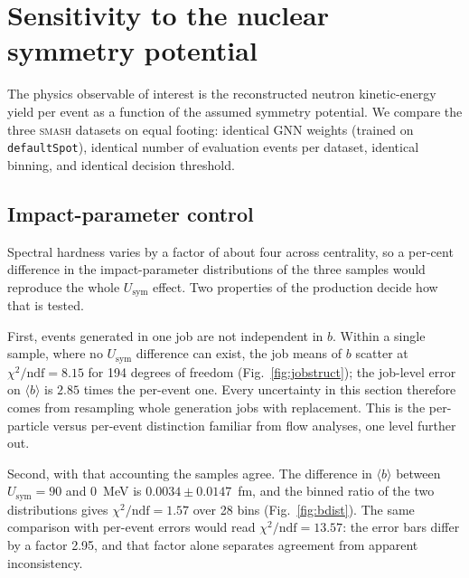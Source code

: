 \documentclass[aps,prc,twocolumn,superscriptaddress,showpacs,%
               nofootinbib,floatfix,longbibliography]{revtex4-2}
\newcommand{\Usym}{U_{\text{sym}}}
\newcommand{\SMASH}{\textsc{smash}}
\begin{document}
\section{Sensitivity to the nuclear symmetry potential}
\label{sec:sensitivity}

The physics observable of interest is the reconstructed neutron
kinetic-energy yield per event as a function of the assumed symmetry
potential.  We compare the three \SMASH{} datasets on equal footing:
identical GNN weights (trained on \texttt{defaultSpot}), identical
number of evaluation events per dataset, identical binning, and
identical decision threshold.

\subsection{Impact-parameter control}
\label{sec:centrality}

Spectral hardness varies by a factor of about four across centrality, so
a per-cent difference in the impact-parameter distributions of the three
samples would reproduce the whole $\Usym{}$ effect.  Two properties of
the production decide how that is tested.

First, events generated in one job are not independent in $b$.  Within a
single sample, where no $\Usym{}$ difference can exist, the job means of
$b$ scatter at $\chi^2/\mathrm{ndf} = 8.15$ for 194 degrees of freedom
(Fig.~\ref{fig:jobstruct}); the job-level error on $\langle b\rangle$ is
$2.85$ times the per-event one.  Every uncertainty in this section
therefore comes from resampling whole generation jobs with replacement.
This is the per-particle versus per-event distinction familiar from flow
analyses, one level further out.

Second, with that accounting the samples agree.  The difference in
$\langle b\rangle$ between $\Usym = 90$ and $0$~MeV is
$0.0034 \pm 0.0147$~fm, and the binned ratio of the two distributions
gives $\chi^2/\mathrm{ndf} = 1.57$ over 28 bins (Fig.~\ref{fig:bdist}).  The same comparison
with per-event errors would read $\chi^2/\mathrm{ndf} = 13.57$: the error
bars differ by a factor 2.95, and that factor alone separates agreement
from apparent inconsistency.
\end{document}
